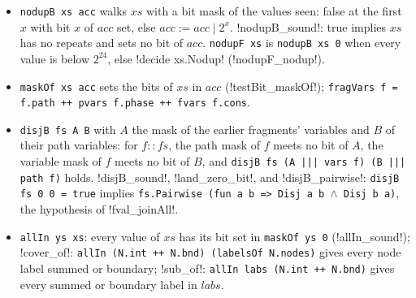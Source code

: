 \begin{definition}\label{def:lean-pathsum-disjb}
\begin{itemize}
\item \textnormal{\texttt{nodupB xs acc}} walks $xs$ with a bit mask of the values seen: false at the first
  $x$ with bit $x$ of $acc$ set, else $acc:=acc\mathbin{|}2^x$. \lean!nodupB_sound!: true implies $xs$ has
  no repeats and sets no bit of $acc$. \textnormal{\texttt{nodupF xs}} is \textnormal{\texttt{nodupB xs 0}} when every value is
  below $2^{24}$, else \lean!decide xs.Nodup! (\lean!nodupF_nodup!).
\item \textnormal{\texttt{maskOf xs acc}} sets the bits of $xs$ in $acc$ (\lean!testBit_maskOf!);
  \textnormal{\texttt{fragVars f = f.path ++ pvars f.phase ++ fvars f.cons}}.
\item \textnormal{\texttt{disjB fs A B}} with $A$ the mask of the earlier fragments' variables and $B$ of their
  path variables: for $f::fs$, the path mask of $f$ meets no bit of $A$, the variable mask of $f$
  meets no bit of $B$, and \textnormal{\texttt{disjB fs (A ||| vars f) (B ||| path f)}} holds.
  \lean!disjB_sound!, \lean!land_zero_bit!, and \lean!disjB_pairwise!: \textnormal{\texttt{disjB fs 0 0 = true}}
  implies \textnormal{\texttt{fs.Pairwise (fun a b => Disj a b \ensuremath{\wedge} Disj b a)}}, the hypothesis of
  \lean!fval_joinAll!.
\item \textnormal{\texttt{allIn ys xs}}: every value of $xs$ has its bit set in \textnormal{\texttt{maskOf ys 0}}
  (\lean!allIn_sound!); \lean!cover_of!: \textnormal{\texttt{allIn (N.int ++ N.bnd) (labelsOf N.nodes)}} gives every
  node label summed or boundary; \lean!sub_of!: \textnormal{\texttt{allIn labs (N.int ++ N.bnd)}} gives every
  summed or boundary label in $labs$.
\end{itemize}
\end{definition}

